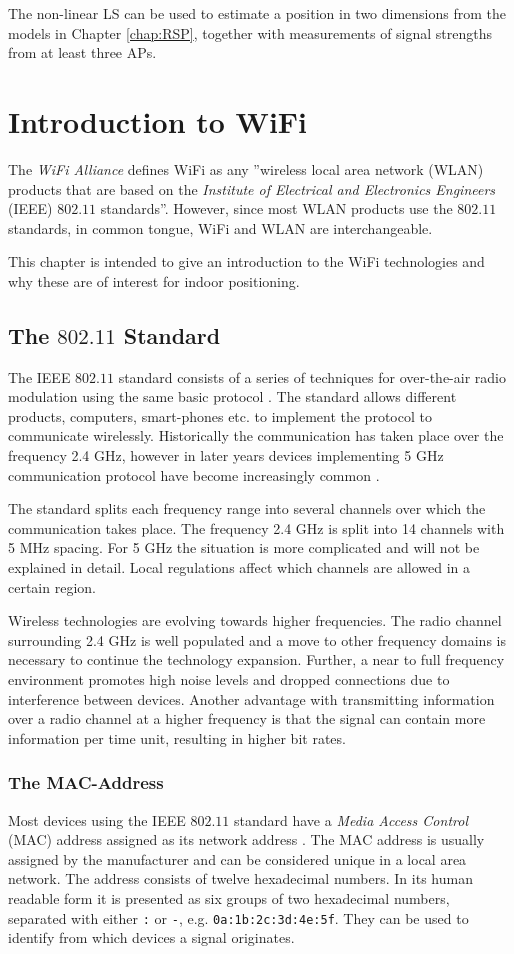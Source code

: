 \documentclass{LTHthesis}
\begin{document}
The non-linear LS can be used to estimate a position in two dimensions from the models in Chapter \ref{chap:RSP}, together with measurements of signal
 strengths from at least three APs. 
%
\chapter{Introduction to WiFi} %
\label{chap:wifi}
The \emph{WiFi Alliance} defines WiFi as any ''wireless local area network (WLAN) products that are based on the \emph{Institute of Electrical and Electronics Engineers} (IEEE) $802.11$ standards''. However, since most WLAN products use the $802.11$ standards, in common tongue, WiFi and WLAN are interchangeable.    

This chapter is intended to give an introduction to the WiFi technologies and why these are of interest for indoor positioning.
%
\section{The $802.11$ Standard}
%
The IEEE $802.11$ standard consists of a series of techniques for over-the-air radio modulation using the same basic protocol \cite{IEEE:802.11}. The standard allows different products, computers, smart-phones etc. to implement the protocol to communicate wirelessly. Historically the communication has taken place over the frequency 2.4 GHz, however in later years devices implementing 5 GHz communication protocol have become increasingly common \cite{walrand10}.

The standard splits each frequency range into several channels over which the communication takes place. The frequency 2.4 GHz is split into 14 channels with 5 MHz spacing. For 5 GHz the situation is more complicated and will not be explained in detail. Local regulations affect which channels are allowed in a certain region.   

Wireless technologies are evolving towards higher frequencies. The radio channel  surrounding 2.4 GHz is well populated and a move to other frequency domains is necessary to continue the technology expansion. Further, a near to full frequency environment promotes high noise levels and dropped connections due to interference between devices. Another advantage with transmitting information over a radio channel at a higher frequency is that the signal can contain more information per time unit, resulting in higher bit rates.    
%
\subsection{The MAC-Address}
%
Most devices using the IEEE $802.11$ standard have a \emph{Media Access Control} (MAC) address assigned as its network address \cite{IEEE:802.11}. The MAC address is usually assigned by the manufacturer and can be considered unique in a local area network. The address consists of twelve hexadecimal numbers. In its human readable form it is presented as six groups of two hexadecimal numbers, separated with either \verb|:| or \verb|-|, e.g. \verb|0a:1b:2c:3d:4e:5f|. They can be used to identify from which devices a signal originates.
%
\end{document}
